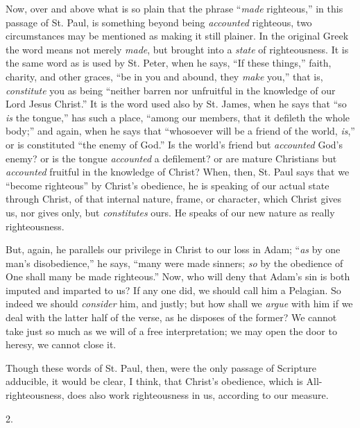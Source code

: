 Now, over and above what is so plain that the phrase ``\emph{made}
righteous,'' in this passage of St. Paul, is something beyond
being \emph{accounted} righteous, two circumstances may be mentioned
as making it still plainer. In the original Greek the word means not
merely \emph{made}, but brought into a \emph{state} of righteousness.
It is the same word as is used by St. Peter, when he says, ``If
these things,'' faith, charity, and other graces, ``be in you
and abound, they \emph{make} you,'' that is, \emph{constitute} you
as being ``neither barren nor unfruitful in the knowledge of our
Lord Jesus Christ.'' It is the word used also by St. James, when
he says that ``so \emph{is} the tongue,'' has such a place,
``among our members, that it defileth the whole body;'' and
again, when he says that ``whosoever will be a friend of the
world, \emph{is},'' or is constituted ``the enemy of
God.'' Is the world's friend but \emph{accounted} God's enemy? or
is the tongue \emph{accounted} a defilement? or are mature Christians
but \emph{accounted} fruitful in the knowledge of Christ? When, then,
St. Paul says that we ``become righteous'' by Christ's
obedience, he is speaking of our actual state through Christ, of that
internal nature, frame, or character, which Christ gives us, nor gives
only, but \emph{constitutes} ours. He speaks of our new nature as
really righteousness.

But, again, he parallels our privilege in Christ to our loss in
Adam; ``\emph{as} by one man's disobedience,'' he says,
``many were made sinners; \emph{so} by the obedience of One shall
many be made righteous.'' Now, who will deny that Adam's sin
is both imputed and imparted to us? If any one did, we should call him
a Pelagian. So indeed we should \emph{consider} him, and justly; but
how shall we \emph{argue} with him if we deal with the latter half of
the verse, as he disposes of the former? We cannot take just so much
as we will of a free interpretation; we may open the door to heresy,
we cannot close it.

Though these words of St. Paul, then, were the only passage of
Scripture adducible, it would be clear, I think, that Christ's
obedience, which is All-righteousness, does also work righteousness in
us, according to our measure.

2.

